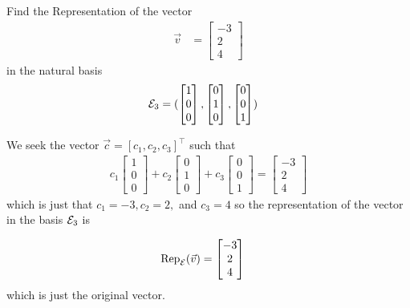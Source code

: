 \begin{example}
Find the Representation of the vector
%
\begin{align*}
\vec{v} & = \begin{bmatrix}
-3 \\ 2\\ 4 
\end{bmatrix}
\end{align*}
in the natural basis
%
\begin{align*}
{\cal E}_3 & = (
\begin{bmatrix}
1 \\ 0 \\ 0
\end{bmatrix}, \begin{bmatrix}
0 \\ 1 \\ 0 
\end{bmatrix}, 
\begin{bmatrix}
0 \\ 0 \\ 1
\end{bmatrix} )
\end{align*}

\solution

We seek the vector $\vec{c}  = [c_1, c_2, c_3]^{\intercal}$ such that 
\begin{align*}
c_1 \begin{bmatrix}
1 \\ 0 \\ 0 
\end{bmatrix} + c_2 \begin{bmatrix}
0 \\ 1 \\ 0 
\end{bmatrix} + c_3 \begin{bmatrix}
0 \\ 0 \\ 1
\end{bmatrix} = \begin{bmatrix}
-3 \\ 2 \\ 4
\end{bmatrix}
\end{align*}
which is just that $c_1=-3, c_2=2,$ and $c_3=4$ so the representation of the vector in the basis ${\cal E}_3$ is 

\begin{align*}
\text{Rep}_{\cal E} (\vec{v}) & = 
\begin{bmatrix}
-3 \\ 2 \\ 4
\end{bmatrix}
\end{align*}
which is just the original vector.  


\end{example}


